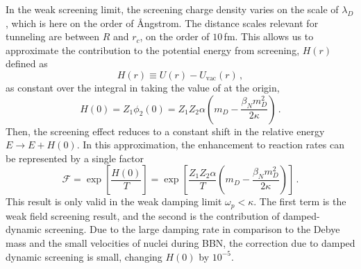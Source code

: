 In the weak screening limit, the screening charge density varies on the scale of $\lambda_D$, which is here on the order of \AA ngstrom. The distance scales relevant for tunneling are between $R$ and $r_c$, on the order of $10\,$fm. This allows us to approximate the contribution to the potential energy from screening, $H(r)$ defined as
\begin{equation}
    H(r) \equiv U(r) - U_\text{vac}(r)\,,
\end{equation}
as constant over the integral in  taking the value of  at the origin,
\begin{equation}
     H(0) = Z_1\phi_2(0) = Z_1 Z_2 \alpha \left(m_D - \frac{\beta_N m_D^2}{2 \kappa}\right)\,.
\end{equation}
Then, the screening effect reduces to a constant shift in the relative energy $E \rightarrow E+H(0)$. In this approximation, the enhancement to reaction rates can be represented by a single factor \cite{Salpeter:1954nc,Kravchuk:2014sps}
\begin{equation}\label{eq:DDSenhance}
   \mathcal{F} = \exp\left[\frac{H(0)}{T} \right]=\exp\left[\frac{Z_1 Z_2 \alpha}{T} \left(m_D - \frac{\beta_N m_D^2}{2 \kappa}\right)\right]\,.
\end{equation}
This result is only valid in the weak damping limit $\omega_p<\kappa$. The first term is the weak field screening result, and the second is the contribution of damped-dynamic screening. Due to the large damping rate in comparison to the Debye mass and the small velocities of nuclei  during BBN, the correction due to damped dynamic screening is small, changing $H(0)$ by $10^{-5}$. 
